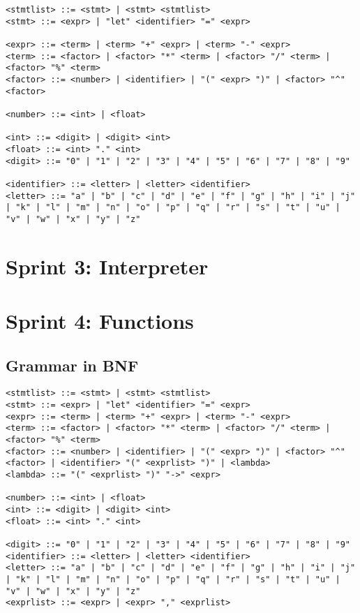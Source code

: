 \documentclass[a4paper, oneside, 11pt]{report}
\begin{document}
\begin{verbatim}
<stmtlist> ::= <stmt> | <stmt> <stmtlist>
<stmt> ::= <expr> | "let" <identifier> "=" <expr>

<expr> ::= <term> | <term> "+" <expr> | <term> "-" <expr>
<term> ::= <factor> | <factor> "*" <term> | <factor> "/" <term> | <factor> "%" <term>
<factor> ::= <number> | <identifier> | "(" <expr> ")" | <factor> "^" <factor>

<number> ::= <int> | <float>

<int> ::= <digit> | <digit> <int>
<float> ::= <int> "." <int>
<digit> ::= "0" | "1" | "2" | "3" | "4" | "5" | "6" | "7" | "8" | "9"

<identifier> ::= <letter> | <letter> <identifier>
<letter> ::= "a" | "b" | "c" | "d" | "e" | "f" | "g" | "h" | "i" | "j" | "k" | "l" | "m" | "n" | "o" | "p" | "q" | "r" | "s" | "t" | "u" | "v" | "w" | "x" | "y" | "z"
\end{verbatim}

\section{Sprint 3: Interpreter}\label{sec:interpreter}

\section{Sprint 4: Functions}\label{sec:functions}

\subsection{Grammar in BNF}\label{subsec:grammar-in-bnf3}

\begin{verbatim}
<stmtlist> ::= <stmt> | <stmt> <stmtlist>
<stmt> ::= <expr> | "let" <identifier> "=" <expr>
<expr> ::= <term> | <term> "+" <expr> | <term> "-" <expr>
<term> ::= <factor> | <factor> "*" <term> | <factor> "/" <term> | <factor> "%" <term>
<factor> ::= <number> | <identifier> | "(" <expr> ")" | <factor> "^" <factor> | <identifier> "(" <exprlist> ")" | <lambda>
<lambda> ::= "(" <exprlist> ")" "->" <expr> 

<number> ::= <int> | <float>
<int> ::= <digit> | <digit> <int>
<float> ::= <int> "." <int>

<digit> ::= "0" | "1" | "2" | "3" | "4" | "5" | "6" | "7" | "8" | "9"
<identifier> ::= <letter> | <letter> <identifier>
<letter> ::= "a" | "b" | "c" | "d" | "e" | "f" | "g" | "h" | "i" | "j" | "k" | "l" | "m" | "n" | "o" | "p" | "q" | "r" | "s" | "t" | "u" | "v" | "w" | "x" | "y" | "z"
<exprlist> ::= <expr> | <expr> "," <exprlist>
	
\end{verbatim}
\end{document}
